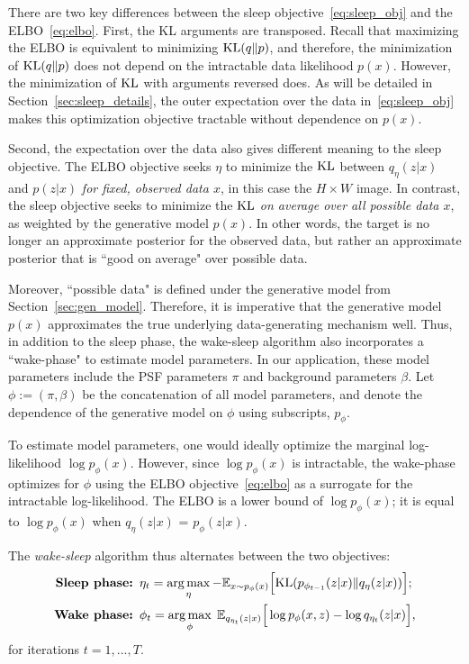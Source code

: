 There are two key differences between the sleep objective~\eqref{eq:sleep_obj} and the ELBO~\eqref{eq:elbo}. 
First, the KL arguments are transposed. 
Recall that maximizing the ELBO is equivalent to minimizing
$\textrm{KL}(q\|p)$, and 
therefore, the minimization of $\textrm{KL}(q\|p)$ does not depend on the intractable data likelihood $p(x)$. 
However, the minimization of $\textrm{KL}$ with arguments reversed does. 
As will be detailed in Section~\ref{sec:sleep_details}, the outer expectation over the data in~\eqref{eq:sleep_obj} makes this optimization objective tractable without dependence on $p(x)$. 

Second, the expectation over the data also gives different meaning to the sleep objective. The ELBO objective seeks $\eta$ to minimize the $\textrm{KL}$ between $q_\eta(z | x)$ and $p(z | x)$ {\itshape for fixed, observed data $x$},
in this case the $H\times W$ image.
In contrast, the sleep objective seeks to minimize the $\textrm{KL}$ {\itshape on average over all possible data $x$}, as weighted by the generative model $p(x)$. 
In other words, the target is no longer an approximate posterior for the observed data, but rather an approximate posterior that is ``good on average" over possible data.

Moreover, ``possible data" is defined under the generative model from Section~\ref{sec:gen_model}. 
Therefore, it is imperative that the generative model $p(x)$ approximates the true underlying data-generating mechanism well. 
Thus, in addition to the sleep phase, the wake-sleep algorithm also incorporates a ``wake-phase" to estimate model parameters.
In our application, these model parameters include the PSF parameters $\pi$ and background parameters $\beta$. Let 
$\phi:=(\pi, \beta)$ be the concatenation of all model parameters, and denote the dependence of the generative model on $\phi$ using subscripts, $p_\phi$. 

To estimate model parameters, one would ideally optimize the marginal log-likelihood $\log p_\phi(x)$.
However, since $\log p_\phi(x)$ is intractable, the wake-phase optimizes for $\phi$ using the ELBO objective~\eqref{eq:elbo}
as a surrogate for the intractable log-likelihood. 
The ELBO is a lower bound of
$\log p_\phi(x)$; 
it is equal to $\log p_\phi(x)$ when $q_\eta(z | x)$ 
= $p_\phi(z | x)$. 

The {\itshape wake-sleep} algorithm thus alternates between the two objectives: 
\begin{align}
    \text{{\bf Sleep phase: }} & 
    \eta_{t} = \operatorname*{arg\,max}_{\eta} -\mathbb{E}_{x \sim p_\phi(x)}\Big[\textrm{KL}(p_{\phi_{t-1}}(z | x) \| q_\eta(z | x))\Big]
    \label{eq:sleep_phase_summary}; 
    \\
    \text{{\bf Wake phase: }} & \phi_{t} = \operatorname*{arg\,max}_{\phi}\; \mathbb{E}_{q_{\eta_t}(z | x)}\Big[\log p_{\phi}(x, z) - \log q_{\eta_t}(z | x)\Big],
    \label{eq:wake_phase_summary}
\end{align} 
for iterations $t = 1, ..., T$. 

